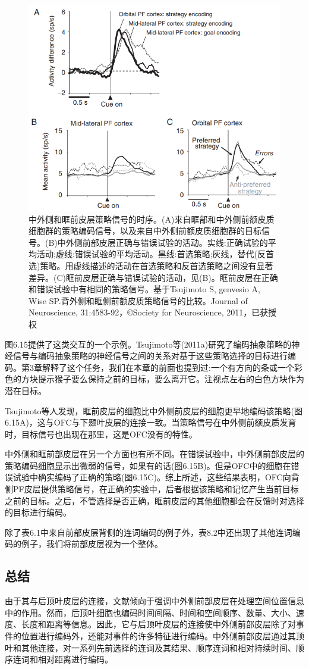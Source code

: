 \begin{figure}
	\centering
	\includegraphics[width=0.5\linewidth]{image_pfc/Fig_6_15}
	\caption{中外侧和眶前皮层策略信号的时序。(A)来自眶部和中外侧前额皮质细胞群的策略编码信号，以及来自中外侧前额皮质细胞群的目标信号。(B)中外侧前部皮层正确与错误试验的活动。实线:正确试验的平均活动;虚线:错误试验的平均活动。黑线:首选策略;灰线，替代(反首选)策略。用虚线描述的活动在首选策略和反首选策略之间没有显著差异。(C)眶前皮层正确与错误试验的活动，见(B)。眶前皮层在正确和错误试验中有相同的策略信号。基于Tsujimoto S, genvesio A, Wise SP.背外侧和眶侧前额皮质策略信号的比较。Journal of Neuroscience, 31:4583-92，©Society for Neuroscience, 2011，已获授权}
	\label{fig:fig}
\end{figure}

图6.15提供了这类交互的一个示例。Tsujimoto等(2011a)研究了编码抽象策略的神经信号与编码抽象策略的神经信号之间的关系对基于这些策略选择的目标进行编码。第3章解释了这个任务，我们在本章的前面也提到过:一个有方向的条或一个彩色的方块提示猴子要么保持之前的目标，要么离开它。注视点左右的白色方块作为潜在目标。

Tsujimoto等人发现，眶前皮层的细胞比中外侧前皮层的细胞更早地编码该策略(图6.15A)，这与OFC与下颞叶皮层的连接一致。当策略信号在中外侧前额皮质发育时，目标信号也出现在那里，这是OFC没有的特性。

中外侧和眶前部皮层在另一个方面也有所不同。在错误试验中，中外侧前部皮层的策略编码细胞显示出微弱的信号，如果有的话(图6.15B)。但是OFC中的细胞在错误试验中确实编码了正确的策略(图6.15C)。综上所述，这些结果表明，OFC向背侧PF皮层提供策略信号，在正确的实验中，后者根据该策略和记忆产生当前目标之前的目标。之后，不管选择是否正确，眶前皮层的其他细胞都会在反馈时对选择的目标进行编码。

除了表6.1中来自前部皮层背侧的连词编码的例子外，表8.2中还出现了其他连词编码的例子，我们将前部皮层视为一个整体。

\subsection{总结}
由于其与后顶叶皮层的连接，文献倾向于强调中外侧前部皮层在处理空间位置信息中的作用。然而，后顶叶细胞也编码时间间隔、时间和空间顺序、数量、大小、速度、长度和距离等信息。因此，它与后顶叶皮层的连接使中外侧前部皮层除了对事件的位置进行编码外，还能对事件的许多特征进行编码。中外侧前部皮层通过其顶叶和其他连接，对一系列先前选择的连词及其结果、顺序连词和相对持续时间、顺序连词和相对距离进行编码。

